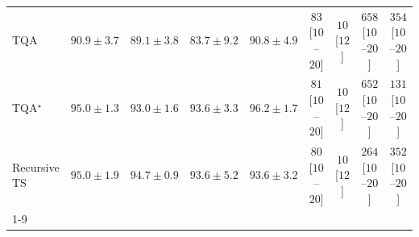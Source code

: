 \begin{tabular}{l|cccc|cccc|}
TQA & {\cellcolor[HTML]{348EBF}} \color[HTML]{F1F1F1} $90.9\pm 3.7$ & {\cellcolor[HTML]{60A1CA}} \color[HTML]{F1F1F1} $89.1\pm 3.8$ & {\cellcolor[HTML]{C6CCE3}} \color[HTML]{000000} $83.7\pm 9.2$ & {\cellcolor[HTML]{3790C0}} \color[HTML]{F1F1F1} $90.8\pm 4.9$ & {\cellcolor[HTML]{FDE3E0}} \color[HTML]{000000} $83$ [$10$--$20$] & {\cellcolor[HTML]{FFF7F3}} \color[HTML]{000000} $10$ [$12$] & {\cellcolor[HTML]{51006C}} \color[HTML]{F1F1F1} $658$ [$10$--$20$] & {\cellcolor[HTML]{F361A0}} \color[HTML]{F1F1F1} $354$ [$10$--$20$] \\
TQA$^\star$ & {\cellcolor[HTML]{046299}} \color[HTML]{F1F1F1} $95.0\pm 1.3$ & {\cellcolor[HTML]{0C74B2}} \color[HTML]{F1F1F1} $93.0\pm 1.6$ & {\cellcolor[HTML]{056EAD}} \color[HTML]{F1F1F1} $93.6\pm 3.3$ & {\cellcolor[HTML]{045687}} \color[HTML]{F1F1F1} $96.2\pm 1.7$ & {\cellcolor[HTML]{FDE4E0}} \color[HTML]{000000} $81$ [$10$--$20$] & {\cellcolor[HTML]{FFF7F3}} \color[HTML]{000000} $10$ [$12$] & {\cellcolor[HTML]{55006D}} \color[HTML]{F1F1F1} $652$ [$10$--$20$] & {\cellcolor[HTML]{FDD4D0}} \color[HTML]{000000} $131$ [$10$--$20$] \\
Recursive TS & {\cellcolor[HTML]{046299}} \color[HTML]{F1F1F1} $95.0\pm 1.9$ & {\cellcolor[HTML]{04649E}} \color[HTML]{F1F1F1} $94.7\pm 0.9$ & {\cellcolor[HTML]{056EAD}} \color[HTML]{F1F1F1} $93.6\pm 5.2$ & {\cellcolor[HTML]{056EAD}} \color[HTML]{F1F1F1} $93.6\pm 3.2$ & {\cellcolor[HTML]{FDE4E0}} \color[HTML]{000000} $80$ [$10$--$20$] & {\cellcolor[HTML]{FFF7F3}} \color[HTML]{000000} $10$ [$12$] & {\cellcolor[HTML]{FA9BB4}} \color[HTML]{000000} $264$ [$10$--$20$] & {\cellcolor[HTML]{F361A0}} \color[HTML]{F1F1F1} $352$ [$10$--$20$] \\
\cline{1-9}
\bottomrule
\end{tabular}
